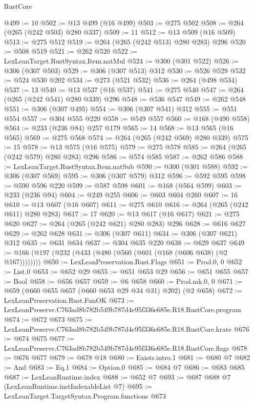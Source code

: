 \begin{lexlean}{RustCore}
\begin{coremodule}
@499 := 10
@502 := @13 @499 (@16 @499)
@503 := @275 @502
@508 := @264 (@265 (@242 @503) @280 @337)
@509 := 11
@512 := @13 @509 (@16 @509)
@513 := @275 @512
@519 := @264 (@265 (@242 @513) @280 @283) @296
@520 := @508 @519
@521 := @262 @520
@522 := LexLeanTarget.RustSyntax.Item.natMul
@524 := @300 (@301 @522)
@526 := @306 (@307 @503)
@529 := @306 (@307 @513) @312
@530 := @526 @529
@532 := @524 @530 @202
@534 := @273 (@521 @532)
@536 := @264 (@498 @534)
@537 := 13
@540 := @13 @537 (@16 @537)
@541 := @275 @540
@547 := @264 (@265 (@242 @541) @280 @339) @296
@548 := @536 @547
@549 := @262 @548
@551 := @306 (@307 @495)
@554 := @306 (@307 @541) @312
@555 := @551 @554
@557 := @304 @555 @220
@558 := @549 @557
@560 := @168 (@490 @558)
@564 := @233 (@236 @84) @257 @179
@565 := 14
@568 := @13 @565 (@16 @565)
@569 := @275 @568
@574 := @264 (@265 (@242 @569) @280 @339)
@575 := 15
@578 := @13 @575 (@16 @575)
@579 := @275 @578
@585 := @264 (@265 (@242 @579) @280 @283) @296
@586 := @574 @585
@587 := @262 @586
@588 := LexLeanTarget.RustSyntax.Item.natSub
@590 := @300 (@301 @588)
@592 := @306 (@307 @569)
@595 := @306 (@307 @579) @312
@596 := @592 @595
@598 := @590 @596 @220
@599 := @587 @598
@601 := @168 (@564 @599)
@603 := @233 (@236 @94)
@604 := @249 @255
@606 := @603 @604 @260
@607 := 16
@610 := @13 @607 (@16 @607)
@611 := @275 @610
@616 := @264 (@265 (@242 @611) @280 @283)
@617 := 17
@620 := @13 @617 (@16 @617)
@621 := @275 @620
@627 := @264 (@265 (@242 @621) @280 @283) @296
@628 := @616 @627
@629 := @262 @628
@631 := @306 (@307 @611)
@634 := @306 (@307 @621) @312
@635 := @631 @634
@637 := @304 @635 @220
@638 := @629 @637
@649 := @166 (@197 (@232 (@433 (@480 (@560 (@601 (@168 (@606 @638) (@2 @167))))))))
@650 := LexLeanPreservation.Rust.Flags
@651 := Prod.{0, 0}
@652 := List.{0}
@653 := @652 @29
@655 := @651 @653 @29
@656 := @651 @655
@657 := Bool
@658 := @656 @657
@659 := @6 @658
@660 := Prod.mk.{0, 0}
@671 := @659 (@660 @655 @657 (@660 @653 @29 @34 @31) @202) (@2 @658)
@672 := LexLeanPreservation.Rust.FunOK
@673 := LexLeanPreserve.C763ad8b782b549b787d4e95f336e685e.R18.RustCore.program
@674 := @672 @673
@675 := LexLeanPreserve.C763ad8b782b549b787d4e95f336e685e.R18.RustCore.krate
@676 := @674 @675
@677 := LexLeanPreserve.C763ad8b782b549b787d4e95f336e685e.R18.RustCore.flags
@678 := @676 @677
@679 := @678 @18
@680 := Exists.intro.{1}
@681 := @680 @7
@682 := And
@683 := Eq.{1}
@684 := Option.{0}
@685 := @684 @7
@686 := @683 @685
@687 := LexLeanRuntime.index
@688 := @652 @7
@693 := @687 @688 @7 (LexLeanRuntime.instIndexableList @7)
@695 := LexLeanTarget.TargetSyntax.Program.functions @673

\end{coremodule}
\end{lexlean}
